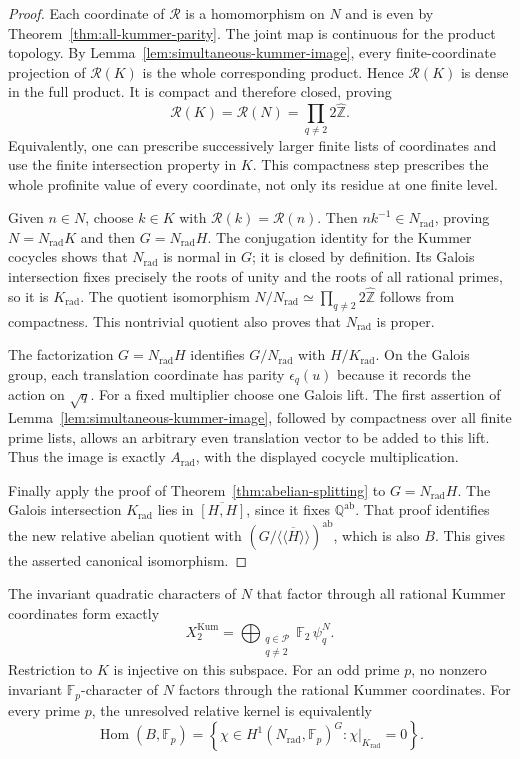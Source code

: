 \begin{proof}
Each coordinate of $\mathcal R$ is a homomorphism on $N$ and is
even by Theorem~\ref{thm:all-kummer-parity}. The joint map is
continuous for the product topology. By
Lemma~\ref{lem:simultaneous-kummer-image}, every finite-coordinate
projection of $\mathcal R(K)$ is the whole corresponding product.
Hence $\mathcal R(K)$ is dense in the full product. It is compact
and therefore closed, proving
\[
 \mathcal R(K)=\mathcal R(N)=\prod_{q\ne2}2\widehat{\mathbb Z}.
\]
Equivalently, one can prescribe successively larger finite lists
of coordinates and use the finite intersection property in $K$.
This compactness step prescribes the whole profinite value of every
coordinate, not only its residue at one finite level.

Given $n\in N$, choose $k\in K$ with $\mathcal R(k)=\mathcal R(n)$.
Then $nk^{-1}\in N_{\mathrm{rad}}$, proving
$N=N_{\mathrm{rad}}K$ and then $G=N_{\mathrm{rad}}H$.
The conjugation identity for the Kummer cocycles shows that
$N_{\mathrm{rad}}$ is normal in $G$; it is closed by definition.
Its Galois intersection fixes precisely the roots of unity and
the roots of all rational primes, so it is $K_{\mathrm{rad}}$.
The quotient isomorphism $N/N_{\mathrm{rad}}\simeq\prod_{q\ne2}
2\widehat{\mathbb Z}$ follows from compactness. This nontrivial
quotient also proves that $N_{\mathrm{rad}}$ is proper.

The factorization $G=N_{\mathrm{rad}}H$ identifies
$G/N_{\mathrm{rad}}$ with $H/K_{\mathrm{rad}}$.
On the Galois group, each translation coordinate has parity
$\epsilon_q(u)$ because it records the action on $\sqrt q$.
For a fixed multiplier choose one Galois lift. The first assertion
of Lemma~\ref{lem:simultaneous-kummer-image}, followed by compactness
over all finite prime lists, allows an arbitrary even translation
vector to be added to this lift. Thus the image is exactly
$A_{\mathrm{rad}}$, with the displayed cocycle multiplication.

Finally apply the proof of Theorem~\ref{thm:abelian-splitting}
to $G=N_{\mathrm{rad}}H$. The Galois intersection
$K_{\mathrm{rad}}$ lies in $\overline{[H,H]}$, since it fixes
$\mathbb Q^{\mathrm{ab}}$. That proof identifies the new relative
abelian quotient with
$(G/\overline{\langle\!\langle H\rangle\!\rangle})^{\mathrm{ab}}$,
which is also $B$. This gives the asserted canonical isomorphism.
\end{proof}

\begin{corollary}\label{cor:rational-kummer-characters}
The invariant quadratic characters of $N$ that factor through all
rational Kummer coordinates form exactly
\[
 X_2^{\mathrm{Kum}}=
 \bigoplus_{\substack{q\in\mathcal P\\q\ne2}}
       \mathbb F_2\,\psi_q^N.
\]
Restriction to $K$ is injective on this subspace. For an odd prime
$p$, no nonzero invariant $\mathbb F_p$-character of $N$ factors
through the rational Kummer coordinates.
For every prime $p$, the unresolved relative kernel is equivalently
\[
 \operatorname{Hom}(B,\mathbb F_p)=
 \left\{\chi\in H^1(N_{\mathrm{rad}},\mathbb F_p)^G:
                       \chi|_{K_{\mathrm{rad}}}=0\right\}.
\]
\end{corollary}

